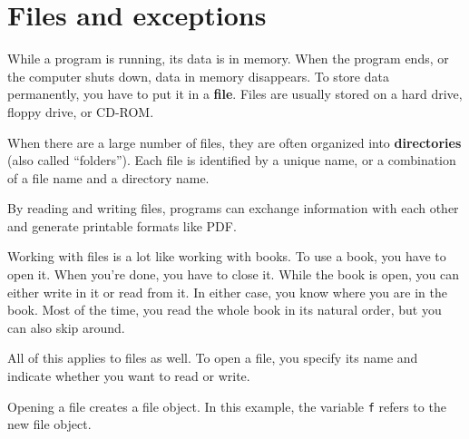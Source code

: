 


\chapter{Files and exceptions}

While a program is running, its data is in memory.  When the program
ends, or the computer shuts down, data in memory disappears.  To
store data permanently, you have to put it in a {\bf file}.
Files are usually stored on a
hard drive, floppy drive, or CD-ROM.

When there are a large number of files, they are often organized
into {\bf directories} (also called ``folders'').
Each file is identified by a unique name, or a combination of a
file name and a directory name.

By reading and writing files, programs can
exchange information with each other and generate printable formats
like PDF.

Working with files is a lot like working with books.  To use a book,
you have to open it.  When you're done, you have to close it.  While
the book is open, you can either write in it or read from it.  In
either case, you know where you are in the book.  Most of the time,
you read the whole book in its natural order, but you can also skip
around.

All of this applies to files as well.  To open a file, you specify
its name and indicate whether you want to read or write.

Opening a file creates a file object.  In this example,
the variable {\tt f} refers to the new file object.

